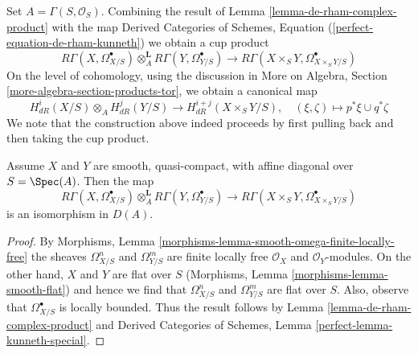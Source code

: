 \noindent
Set $A = \Gamma(S, \mathcal{O}_S)$. Combining the result of
Lemma \ref{lemma-de-rham-complex-product} with the map
Derived Categories of Schemes, Equation
(\ref{perfect-equation-de-rham-kunneth})
we obtain a cup product
$$
R\Gamma(X, \Omega^\bullet_{X/S})
\otimes_A^\mathbf{L}
R\Gamma(Y, \Omega^\bullet_{Y/S})
\longrightarrow
R\Gamma(X \times_S Y, \Omega^\bullet_{X \times_S Y/S})
$$
On the level of cohomology, using the discussion in
More on Algebra, Section \ref{more-algebra-section-products-tor},
we obtain a canonical map
$$
H^i_{dR}(X/S) \otimes_A H^j_{dR}(Y/S)
\longrightarrow
H^{i + j}_{dR}(X \times_S Y/S),\quad
(\xi, \zeta) \longmapsto p^*\xi \cup q^*\zeta
$$
We note that the construction above indeed proceeds by
first pulling back and then taking the cup product.

\begin{lemma}
\label{lemma-kunneth-de-rham}
Assume $X$ and $Y$ are smooth, quasi-compact, with affine diagonal over
$S = \Spec(A)$. Then the map
$$
R\Gamma(X, \Omega^\bullet_{X/S})
\otimes_A^\mathbf{L}
R\Gamma(Y, \Omega^\bullet_{Y/S})
\longrightarrow
R\Gamma(X \times_S Y, \Omega^\bullet_{X \times_S Y/S})
$$
is an isomorphism in $D(A)$.
\end{lemma}

\begin{proof}
By Morphisms, Lemma \ref{morphisms-lemma-smooth-omega-finite-locally-free}
the sheaves $\Omega^n_{X/S}$ and $\Omega^m_{Y/S}$ are finite locally free
$\mathcal{O}_X$ and $\mathcal{O}_Y$-modules. On the other hand, $X$ and $Y$
are flat over $S$ (Morphisms, Lemma \ref{morphisms-lemma-smooth-flat})
and hence we find that $\Omega^n_{X/S}$ and $\Omega^m_{Y/S}$ are flat over $S$.
Also, observe that $\Omega^\bullet_{X/S}$ is locally bounded. Thus
the result follows by Lemma \ref{lemma-de-rham-complex-product} and
Derived Categories of Schemes, Lemma \ref{perfect-lemma-kunneth-special}.
\end{proof}

